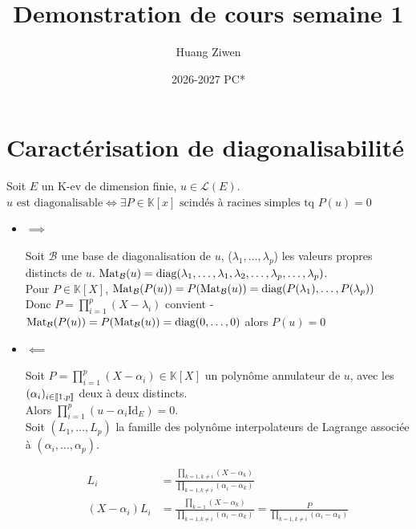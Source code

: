 \documentclass[]{article}
\title{Demonstration de cours semaine 1}
\author{Huang Ziwen}
\date{2026-2027 PC*}
\begin{document}
\section{Caractérisation de diagonalisabilité}

Soit $E$ un K-ev de dimension finie, $u \in \mathcal{L}(E)$. \\

\underline{$ u \text{ est diagonalisable} \iff \exists P \in \mathbb{K}[x] \text{ scindés à racines simples tq } P(u) = 0 $} \\

\begin{itemize}
    \item $\boxed{\implies}$
    
    Soit $\mathcal{B}$ une base de diagonalisation de $u$, ($\lambda_1, \dots, \lambda_p$) les valeurs propres distincts de $u$. $\text{Mat}_{\mathcal{B}}(u) = \text{diag}(\lambda_1, \dots, \lambda_1, \lambda_2, \dots, \lambda_p, \dots, \lambda_p)$. \\

    Pour $P \in \mathbb{K}[X]$, $\text{Mat}_{\mathcal{B}}(P(u)) = P(\text{Mat}_{\mathcal{B}}(u)) = \text{diag}(P(\lambda_1), \dots, P(\lambda_p))$\\

    Donc $P = \prod_{i=1}^{p} (X-\lambda_i)$ convient - $\text{Mat}_{\mathcal{B}}(P(u)) = P(\text{Mat}_{\mathcal{B}}(u)) = \text{diag}(0, \dots, 0)$ alors $P(u) = 0$

    \item $\boxed{\impliedby}$
    
    Soit $P = \prod_{i=1}^p(X-\alpha_i) \in \mathbb{K}[X]$ un polynôme annulateur de $u$, avec les $(\alpha_i)_{i \in \llbracket {1}, {p} \rrbracket}$ deux à deux distincts. \\
    
    Alors $\prod_{i=1}^p(u-\alpha_i \text{Id}_E) = 0$. \\

    Soit $(L_1, \dots, L_p)$ la famille des polynôme interpolateurs de Lagrange associée à $(\alpha_i, \dots, \alpha_p)$. 

    \begin{align*}
        L_i &= \frac{\prod_{k=1, k \neq i}(X - \alpha_k)}{\prod_{k=1, k \neq i}(\alpha_i - \alpha_k)} \\
        (X-\alpha_i)L_i &= \frac{\prod_{k=1}(X - \alpha_k)}{\prod_{k=1, k \neq i}(\alpha_i - \alpha_k)} = \frac{P}{\prod_{k=1, k \neq i}(\alpha_i - \alpha_k)}
    \end{align*}


\end{itemize}
\end{document}
